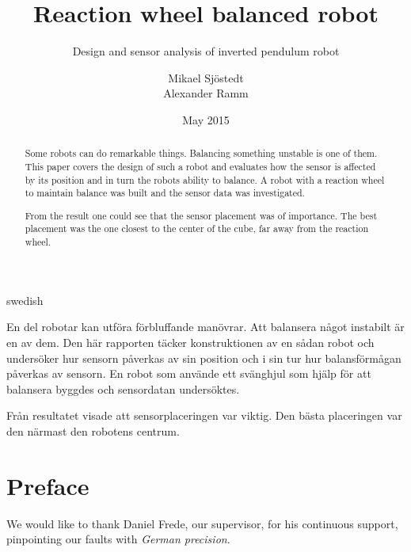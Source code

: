 \documentclass[a4paper,11pt]{kth-mag}
\title{Reaction wheel balanced robot}
\subtitle{Design and sensor analysis of inverted pendulum robot}
\author{Mikael Sjöstedt \\ Alexander Ramm}
\date{May 2015}
\begin{document}

\clearpage

\frontmatter
\pagestyle{plain}
{}
\maketitle
{}
\begin{abstract}
Some robots can do remarkable things. Balancing something unstable is one of them. This paper covers the design of such a robot and evaluates how the sensor is affected by its position and in turn the robots ability to balance. A robot with a reaction wheel to maintain balance was built and the sensor data was investigated.

From the result one could see that the sensor placement was of importance. The best placement was the one closest to the center of the cube, far away from the reaction wheel.
 
\end{abstract}
\cleardoublepage
\begin{foreignabstract}{swedish}
En del robotar kan utföra förbluffande manövrar. Att balansera något instabilt är en av dem. Den här rapporten täcker konstruktionen av en sådan robot och undersöker hur sensorn påverkas av sin position och i sin tur hur balansförmågan påverkas av sensorn. En robot som använde ett svänghjul som hjälp för att balansera byggdes och sensordatan undersöktes.

Från resultatet visade att sensorplaceringen var viktig. Den bästa placeringen var den närmast den robotens centrum.
\\


\end{foreignabstract}
\clearpage
\chapter*{Preface}
We would like to thank Daniel Frede, our supervisor, for his continuous support, pinpointing our faults with \textit{German precision}.
\end{document}
